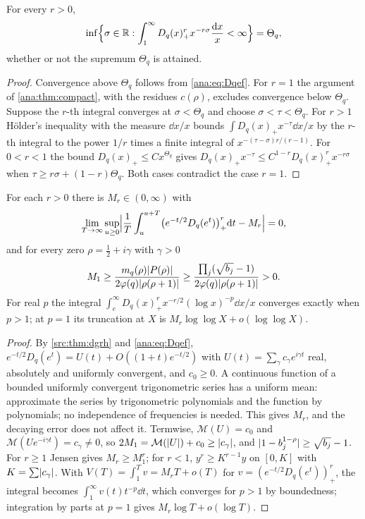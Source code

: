 \begin{theorem}\label{ana:thm:moments}
For every $r>0$,
\[
 \inf\Bigl\{\sigma\in\mathbb{R}:\int_1^\infty D_q(x)_+^rx^{-r\sigma}\frac{\mathrm{d} x}x<\infty\Bigr\}=\Theta_q,
\]
whether or not the supremum $\Theta_q$ is attained.
\end{theorem}

\begin{proof}
Convergence above $\Theta_q$ follows from \eqref{ana:eq:Dqef}. For $r=1$ the argument of
\cref{ana:thm:compact}, with the residues $c(\rho)$, excludes convergence below $\Theta_q$.
Suppose the $r$-th integral converges at $\sigma<\Theta_q$ and choose $\sigma<\tau<\Theta_q$.
For $r>1$ H\"older's inequality with the measure $\dd x/x$ bounds
$\int D_q(x)_+x^{-\tau}\dd x/x$ by the $r$-th integral to the power $1/r$ times a finite
integral of $x^{-(\tau-\sigma)r/(r-1)}$. For $0<r<1$ the bound $D_q(x)_+\le Cx^{\Theta_q}$
gives $D_q(x)_+x^{-\tau}\le C^{1-r}D_q(x)_+^rx^{-r\sigma}$ when $\tau\ge r\sigma+(1-r)\Theta_q$.
Both cases contradict the case $r=1$.
\end{proof}

\begin{theorem}\label{ana:thm:critical}
For each $r>0$ there is $M_r\in(0,\infty)$ with
\[
 \lim_{T\to\infty}\sup_{u\ge0}\Bigl|\frac1T\int_u^{u+T}\bigl(e^{-t/2}D_q(e^t)\bigr)_+^r\mathrm{d} t
 -M_r\Bigr|=0,
\]
and for every zero $\rho=\frac12+i\gamma$ with $\gamma>0$
\[
 M_1\ge\frac{m_q(\rho)\lvert P(\rho)\rvert}{2\varphi(q)\lvert\rho(\rho+1)\rvert}
 \ge\frac{\prod_j(\sqrt{b_j}-1)}{2\varphi(q)\lvert\rho(\rho+1)\rvert}>0 .
\]
For real $p$ the integral $\int_e^\infty D_q(x)_+^rx^{-r/2}(\log x)^{-p}\dd x/x$ converges
exactly when $p>1$; at $p=1$ its truncation at $X$ is $M_r\log\log X+o(\log\log X)$.
\end{theorem}

\begin{proof}
By \cref{src:thm:dgrh} and \eqref{ana:eq:Dqef},
$e^{-t/2}D_q(e^t)=U(t)+O((1+t)e^{-t/2})$ with $U(t)=\sum_\gamma c_\gamma e^{i\gamma t}$ real,
absolutely and uniformly convergent, and $c_0\ge0$. A continuous function of a bounded
uniformly convergent trigonometric series has a uniform mean: approximate the series by
trigonometric polynomials and the function by polynomials; no independence of frequencies is
needed. This gives $M_r$, and the decaying error does not affect it. Termwise,
$\mathcal M(U)=c_0$ and $\mathcal M(Ue^{-i\gamma t})=c_\gamma\ne0$, so
$2M_1=\mathcal M(\lvert U\rvert)+c_0\ge\lvert c_\gamma\rvert$, and $\lvert1-b_j^{1-\rho}\rvert\ge\sqrt{b_j}-1$. For
$r\ge1$ Jensen gives $M_r\ge M_1^r$; for $r<1$, $y^r\ge K^{r-1}y$ on $[0,K]$ with
$K=\sum\lvert c_\gamma\rvert$. With $V(T)=\int_1^Tv=M_rT+o(T)$ for $v=(e^{-t/2}D_q(e^t))_+^r$, the
integral becomes $\int_1^\infty v(t)t^{-p}\dd t$, which converges for $p>1$ by boundedness;
integration by parts at $p=1$ gives $M_r\log T+o(\log T)$.
\end{proof}

